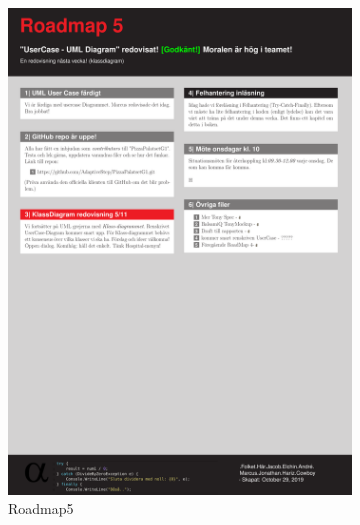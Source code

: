 \documentclass{article}
\theoremstyle{remark}                                         %
\begin{document}
\begin{figure}
\begin{subfigure}[b]{0.3\textwidth}
        \includegraphics[width=\textwidth]{img/Roadmap5.pdf}
        \caption{Roadmap5}
        \label{fig:road5}
    \end{subfigure}    
    \begin{subfigure}[b]{0.3\textwidth}

\end{subfigure}
\end{figure}
\end{document}
